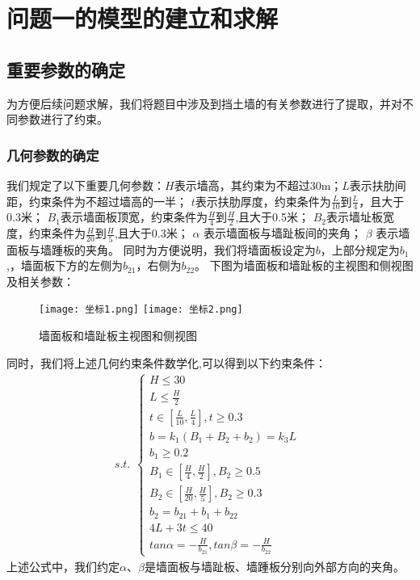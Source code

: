 \documentclass[withoutpreface,bwprint]{cumcmthesis}
\begin{document}

\section{问题一的模型的建立和求解}
\subsection{重要参数的确定}
为方便后续问题求解，我们将题目中涉及到挡土墙的有关参数进行了提取，并对不同参数进行了约束。
\par
\subsubsection{几何参数的确定}
我们规定了以下重要几何参数：$H$表示墙高，其约束为不超过30m；$L$表示扶肋间距，约束条件为不超过墙高的一半；
$t$表示扶肋厚度，约束条件为$\frac{L}{10}$到$\frac{L}{4}$，且大于0.3米；
$B_1$表示墙面板顶宽，约束条件为$\frac{H}{4}$到$\frac{H}{2}$,且大于0.5米；
$B_2$表示墙址板宽度，约束条件为$\frac{H}{20}$到$\frac{H}{5}$,且大于0.3米；
$\alpha$ 表示墙面板与墙趾板间的夹角；
$\beta$ 表示墙面板与墙踵板的夹角。
同时为方便说明，我们将墙面板设定为$b$，上部分规定为$b_1$,，墙面板下方的左侧为$b_{21}$，右侧为$b_{22}$。
下图为墙面板和墙趾板的主视图和侧视图及相关参数：

    \begin{figure}[H]
    \centering
    {\texttt{[image: 坐标1.png]}}
    {\texttt{[image: 坐标2.png]}}
    \caption{墙面板和墙趾板主视图和侧视图}\label{fig:墙面板和墙趾板主视图和侧视图}
    \end{figure} 

同时，我们将上述几何约束条件数学化,可以得到以下约束条件：
\begin{equation}
    s.t.    
    \begin{aligned}
        \begin{cases}
            H\leq30 \\
            L\leq\frac{H}{2} \\
            t\in[\frac{L}{10},\frac{L}{4}],t\geq0.3 \\
            b=k_{1}(B_{1}+B_{2}+b_{2})=k_{3}L \\
            b_{1}\geq0.2 \\
            B_{1}\in[\frac{H}{4},\frac{H}{2}],B_{2}\geq0.5 \\
            B_{2}\in[\frac{H}{20},\frac{H}{5}],B_{2}\geq0.3 \\
            b_{2}=b_{21}+b_{1}+b_{22} \\
            4L+3t\leq40 \\
            tan\alpha=-\frac{H}{b_{21}},tan\beta=-\frac{H}{b_{22} }
        \end{cases}
    \end{aligned}
\end{equation}
上述公式中，我们约定$\alpha$、$\beta$是墙面板与墙趾板、墙踵板分别向外部方向的夹角。
\end{document}
